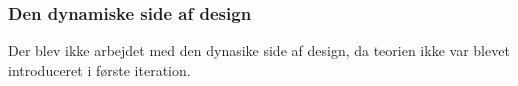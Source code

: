 \subsubsection{Den dynamiske side af design}
Der blev ikke arbejdet med den dynasike side af design, da teorien ikke var blevet introduceret i første iteration. 